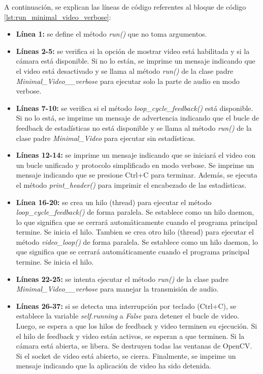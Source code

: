 A continuación, se explican las líneas de código referentes al bloque de código \ref{lst:run_minimal_video_verbose}:
\begin{itemize}
    \item \textbf{Línea 1:} se define el método \textit{run()} que no toma argumentos.
    \item \textbf{Líneas 2-5:} se verifica si la opción de mostrar video está habilitada y si la cámara está disponible. Si no lo están, se imprime un mensaje indicando que el video está desactivado y se llama al método \textit{run()} de la clase padre \textit{Minimal\_Video\_\_verbose} para ejecutar solo la parte de audio en modo verbose.
    \item \textbf{Líneas 7-10:} se verifica si el método \textit{loop\_cycle\_feedback()} está disponible. Si no lo está, se imprime un mensaje de advertencia indicando que el bucle de feedback de estadísticas no está disponible y se llama al método \textit{run()} de la clase padre \textit{Minimal\_Video} para ejecutar sin estadísticas.
    \item \textbf{Líneas 12-14:} se imprime un mensaje indicando que se iniciará el video con un bucle unificado y protocolo simplificado en modo verbose. Se imprime un mensaje indicando que se presione Ctrl+C para terminar. Además, se ejecuta el método \textit{print\_header()} para imprimir el encabezado de las estadísticas.
    \item \textbf{Línea 16-20:} se crea un hilo (thread) para ejecutar el método \textit{loop\_cycle\_feedback()} de forma paralela. Se establece como un hilo daemon, lo que significa que se cerrará automáticamente cuando el programa principal termine. Se inicia el hilo. Tambien se crea otro hilo (thread) para ejecutar el método \textit{video\_loop()} de forma paralela. Se establece como un hilo daemon, lo que significa que se cerrará automáticamente cuando el programa principal termine. Se inicia el hilo.
    \item \textbf{Líneas 22-25:} se intenta ejecutar el método \textit{run()} de la clase padre \textit{Minimal\_Video\_\_verbose} para manejar la transmisión de audio.
    \item \textbf{Líneas 26-37:} si se detecta una interrupción por teclado (Ctrl+C), se establece la variable \textit{self.running} a \textit{False} para detener el bucle de video. Luego, se espera a que los hilos de feedback y video terminen su ejecución. Si el hilo de feedback y video están activos, se esperan a que terminen. Si la cámara está abierta, se libera. Se destruyen todas las ventanas de OpenCV. Si el socket de video está abierto, se cierra. Finalmente, se imprime un mensaje indicando que la aplicación de video ha sido detenida.
\end{itemize}
\vspace{\baselineskip}

